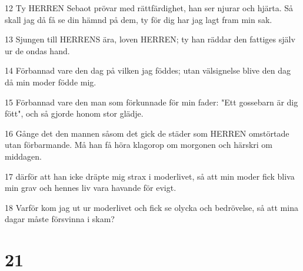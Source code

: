 \par 12 Ty HERREN Sebaot prövar med rättfärdighet, han ser njurar och hjärta. Så skall jag då få se din hämnd på dem, ty för dig har jag lagt fram min sak.
\par 13 Sjungen till HERRENS ära, loven HERREN; ty han räddar den fattiges själv ur de ondas hand.
\par 14 Förbannad vare den dag på vilken jag föddes; utan välsignelse blive den dag då min moder födde mig.
\par 15 Förbannad vare den man som förkunnade för min fader: "Ett gossebarn är dig fött", och så gjorde honom stor glädje.
\par 16 Gånge det den mannen såsom det gick de städer som HERREN omstörtade utan förbarmande. Må han få höra klagorop om morgonen och härskri om middagen.
\par 17 därför att han icke dräpte mig strax i moderlivet, så att min moder fick bliva min grav och hennes liv vara havande för evigt.
\par 18 Varför kom jag ut ur moderlivet och fick se olycka och bedrövelse, så att mina dagar måste försvinna i skam?

\chapter{21}

